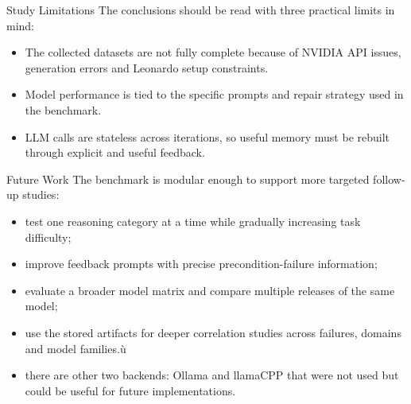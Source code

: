 \documentclass{beamer}
\begin{document}
\begin{frame}{Study Limitations}\footnotesize
    The conclusions should be read with three practical limits in mind:

    \vspace{0.3cm}
    \begin{itemize}
        \item The collected datasets are not fully complete because of NVIDIA API issues, generation errors and Leonardo setup constraints.
        \item Model performance is tied to the specific prompts and repair strategy used in the benchmark.
        \item LLM calls are stateless across iterations, so useful memory must be rebuilt through explicit and useful feedback.
    \end{itemize}
\end{frame}

\begin{frame}{Future Work}\footnotesize
    The benchmark is modular enough to support more targeted follow-up studies:

    \vspace{0.3cm}
    \begin{itemize}
        \item test one reasoning category at a time while gradually increasing task difficulty;
        \item improve feedback prompts with precise precondition-failure information;
        \item evaluate a broader model matrix and compare multiple releases of the same model;
        \item use the stored artifacts for deeper correlation studies across failures, domains and model families.ù
        \item there are other two backends: Ollama and llamaCPP that were not used but could be useful for future implementations.
    \end{itemize}
\end{frame}
\end{document}
